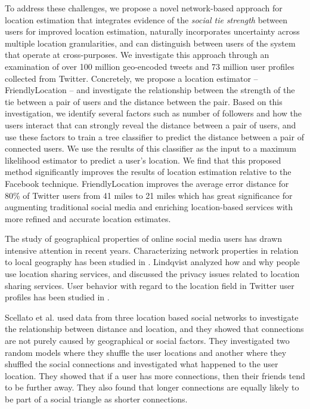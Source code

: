 To address these challenges, we propose a novel network-based approach for
location estimation that
  integrates evidence of the \textit{social tie strength} between users for improved location estimation,
  naturally incorporates uncertainty across multiple location granularities,
  and can distinguish between users of the system that operate at cross-purposes.
We investigate this approach through an examination of over 100 million
geo-encoded tweets and 73 million user profiles collected from Twitter.
%
Concretely, we propose a location estimator -- FriendlyLocation -- and
investigate the relationship between the strength of the tie between a pair of
users and the distance between the pair.
%
Based on this investigation, we identify several factors such as number of
followers and how the users interact that can strongly reveal the distance
between a pair of users, and use these factors to train a tree classifier to
predict the distance between a pair of connected users.
%
We use the results of this classifier as the input to a maximum likelihood
estimator to predict a user's location.
%
We find that this proposed method significantly improves the results of
location estimation relative to the Facebook technique.
%
FriendlyLocation improves the average error distance for 80\% of Twitter users
from 41 miles to 21 miles which has great significance for augmenting
traditional social media and enriching location-based services with more
refined and accurate location estimates.


The study of geographical properties of online social media users has drawn
intensive attention in recent years.
%
Characterizing network properties in relation to local geography has been
studied in \cite{yardi2010tweeting}.
%
Lindqvist \cite{lindqvist2011mayor} analyzed how and why people use location
sharing services, and discussed the privacy issues related to location sharing
services.
%
User behavior with regard to the location field in Twitter user profiles has
been studied in \cite{hecht2011tweets}.

Scellato et al.  \cite{scellato2011socio} used data from three location based
social networks to investigate the relationship between distance and location,
and they showed that connections are not purely caused by geographical or
social factors.
%
They investigated two random models where they shuffle the user locations and
another where they shuffled the social connections and investigated what
happened to the user location.
%
They showed that if a user has more connections, then their friends tend to be
further away.
%
They also found that longer connections are equally likely to be part of a
social triangle as shorter connections.

